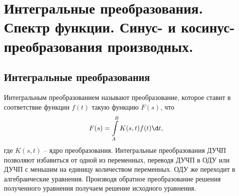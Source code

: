 \chapter{Интегральные преобразования. Спектр функции. Синус- и
косинус-преобразования производных.}

\section{Интегральные преобразования}
Интегральным преобразованием называют преобразование, которое ставит в
соответствие функции \( f(t) \) такую функцию \( F(s) \), что
\[
    F(s) = \int\limits_A^B K(s, t)f(t)\d t,
\]
где \( K(s, t) \) -- ядро преобразования. Интегральные преобразования ДУЧП
позволяют избавиться от одной из переменных, переводя ДУЧП в ОДУ или ДУЧП с
меньшим на единицу количеством переменных. ОДУ же переходит в алгебраические
уравнения. Производя обратное преобразование решения полученного уравнения
получаем решение исходного уравнения.

